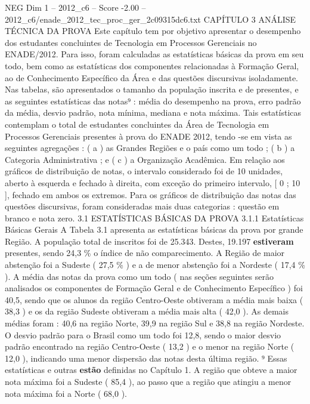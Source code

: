 \begin{textsample}{NEG Dim 1 – 2012\_c6 – Score -2.00 – 2012\_c6/enade\_2012\_tec\_proc\_ger\_2c09315dc6.txt}  \label{ex:f1_neg_257}
CAPÍTULO 3 ANÁLISE TÉCNICA DA PROVA Este capítulo tem por objetivo apresentar o desempenho dos estudantes concluintes de Tecnologia em Processos Gerenciais no ENADE/2012.
Para isso, foram calculadas as estatísticas básicas da prova em seu todo, bem como as estatísticas dos componentes relacionadas à Formação Geral, ao de Conhecimento Específico da Área e das questões discursivas isoladamente.
Nas tabelas, são apresentados o tamanho da população inscrita e de presentes, e as seguintes estatísticas das notas⁹ : média do desempenho na prova, erro padrão da média, desvio padrão, nota mínima, mediana e nota máxima.
Tais estatísticas contemplam o total de estudantes concluintes da Área de Tecnologia em Processos Gerenciais presentes à prova do ENADE 2012, tendo -se em vista as seguintes agregações : ( a ) as Grandes Regiões e o país como um todo ; ( b ) a Categoria Administrativa ; e ( c ) a Organização Acadêmica.
Em relação aos gráficos de distribuição de notas, o intervalo considerado foi de 10 unidades, aberto à esquerda e fechado à direita, com exceção do primeiro intervalo, [ 0 ; 10 ], fechado em ambos os extremos.
Para os gráficos de distribuição das notas das questões discursivas, foram consideradas mais duas categorias : questão em branco e nota zero. 3.1 ESTATÍSTICAS BÁSICAS DA PROVA 3.1.1 Estatísticas Básicas Gerais A Tabela 3.1 apresenta as estatísticas básicas da prova por grande Região.
A população total de inscritos foi de 25.343.
Destes, 19.197 \textbf{estiveram} presentes, sendo 24,3 \% o índice de não comparecimento.
A Região de maior abstenção foi a Sudeste ( 27,5 \% ) e a de menor abstenção foi a Nordeste ( 17,4 \% ).
A média das notas da prova como um todo ( nas seções seguintes serão analisados os componentes de Formação Geral e de Conhecimento Específico ) foi 40,5, sendo que os alunos da região Centro-Oeste obtiveram a média mais baixa ( 38,3 ) e os da região Sudeste obtiveram a média mais alta ( 42,0 ).
As demais médias foram : 40,6 na região Norte, 39,9 na região Sul e 38,8 na região Nordeste.
O desvio padrão para o Brasil como um todo foi 12,8, sendo o maior desvio padrão encontrado na região Centro-Oeste ( 13,2 ) e o menor na região Norte ( 12,0 ), indicando uma menor dispersão das notas desta última região. ⁹ Essas estatísticas e outras \textbf{estão} definidas no Capítulo 1.
A região que obteve a maior nota máxima foi a Sudeste ( 85,4 ), ao passo que a região que atingiu a menor nota máxima foi a Norte ( 68,0 ).

\end{textsample}
